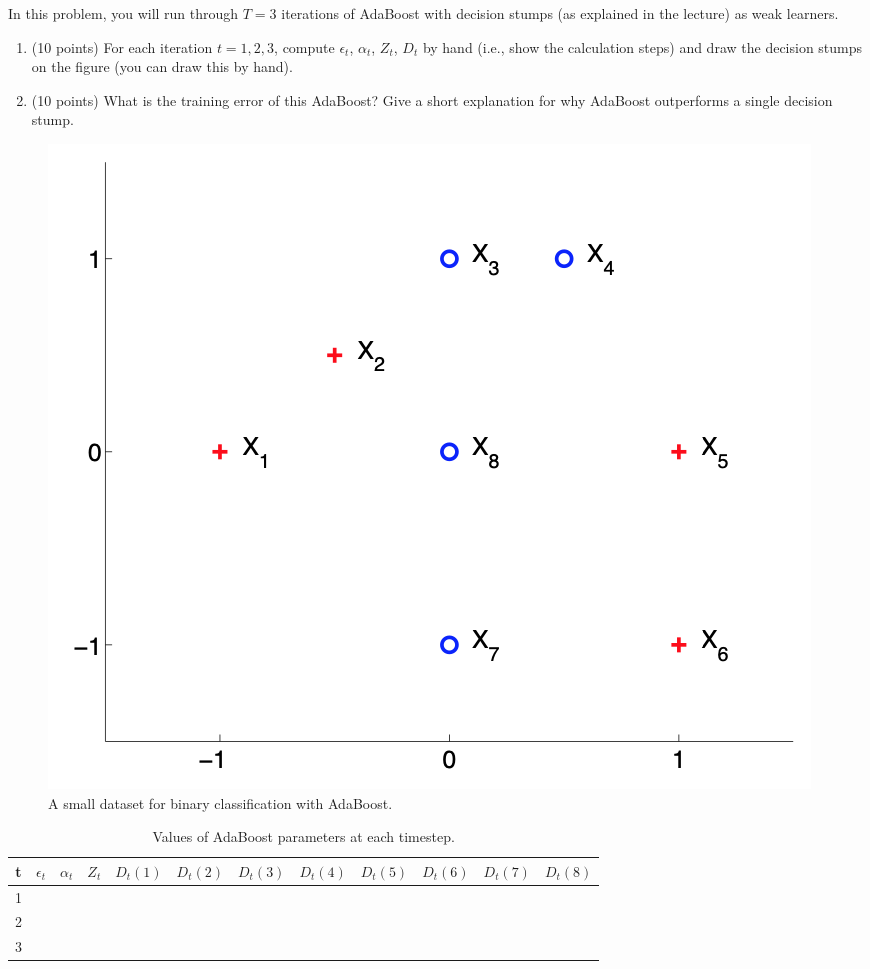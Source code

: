 \documentclass[twoside,10pt]{article}
\begin{document}
\begin{enumerate}
In this problem, you will run through $T = 3$ iterations of AdaBoost with decision stumps (as explained in the lecture) as weak learners.

\begin{enumerate}
\item (10 points) For each iteration $t = 1, 2, 3$, compute $\epsilon_t$, $\alpha_t$, $Z_t$, $D_t$ by hand (i.e., show the calculation steps) and draw the decision stumps on the figure (you can draw this by hand). 

\item (10 points) What is the training error of this AdaBoost? Give a short explanation for why AdaBoost outperforms a single decision stump.

\end{enumerate}


\begin{figure}[h!]
\begin{center}
\includegraphics[width =.5 \textwidth]{hw}
\end{center}
\caption{ A small dataset for binary classification with AdaBoost.}
\end{figure}

\begin{table}
\begin{center}
\caption{Values of AdaBoost parameters at each timestep.}
\vspace{0.1in}
\begin{tabular}{|c|c|c|c|c|c|c|c|c|c|c|c|}\hline
t & $\epsilon_t$ & $\alpha_t$ & $Z_t$ & $D_t(1)$ & $D_t(2)$ & $D_t(3)$ & $D_t(4)$ & $D_t(5)$ & $D_t(6)$ & $D_t(7)$ & $D_t(8)$ \\\hline
1 & & & & & & & & & & & \\
2 & & & & & & & & & & &\\
3 & & & & & & & & & & & \\\hline
\end{tabular}
\end{center}
\end{table}


\end{enumerate}
\end{document}
